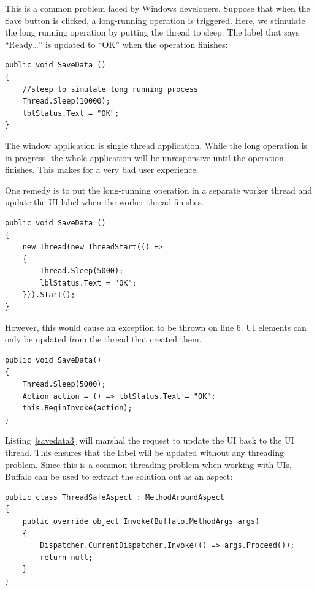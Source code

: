 This is a common problem faced by Windows developers. Suppose that when the Save button is clicked, a long-running operation is triggered. Here, we stimulate the long running operation by putting the thread to sleep. The label that says “Ready…” is updated to “OK” when the operation finishes:

\begin{lstlisting}[caption={Long-running Operation}, label=savedata1, frame=tb, basicstyle=\scriptsize]
public void SaveData ()
{
    //sleep to simulate long running process
    Thread.Sleep(10000);
    lblStatus.Text = "OK";
}
\end{lstlisting}

The window application is single thread application. While the long operation is in progress, the whole application will be unresponsive until the operation finishes. This makes for a very bad user experience.

One remedy is to put the long-running operation in a separate worker thread and update the UI label when the worker thread finishes.

\begin{lstlisting}[caption={Long-running Operation With Thread}, label=savedata2, frame=tb, basicstyle=\scriptsize]
public void SaveData ()
{
    new Thread(new ThreadStart(() =>
    {
        Thread.Sleep(5000);
        lblStatus.Text = "OK";
    })).Start();
}
\end{lstlisting}

However, this would cause an exception to be thrown on line 6. UI elements can only be updated from the thread that created them.

\begin{lstlisting}[caption={Update UI From Different Thread}, label=savedata3, frame=tb, basicstyle=\scriptsize]
public void SaveData()
{ 
    Thread.Sleep(5000);
    Action action = () => lblStatus.Text = "OK";
    this.BeginInvoke(action);
}
\end{lstlisting}

Listing~\ref{savedata3} will marshal the request to update the UI back to the UI thread. This ensures that the label will be updated without any threading problem.
Since this is a common threading problem when working with UIs, Buffalo can be used to extract the solution out as an aspect:

\begin{lstlisting}[caption={ThreadSafeAspect}, label=savedata4, frame=tb, basicstyle=\scriptsize]
public class ThreadSafeAspect : MethodAroundAspect
{
	public override object Invoke(Buffalo.MethodArgs args)
	{
		Dispatcher.CurrentDispatcher.Invoke(() => args.Proceed());
		return null;
	}
}
\end{lstlisting}

